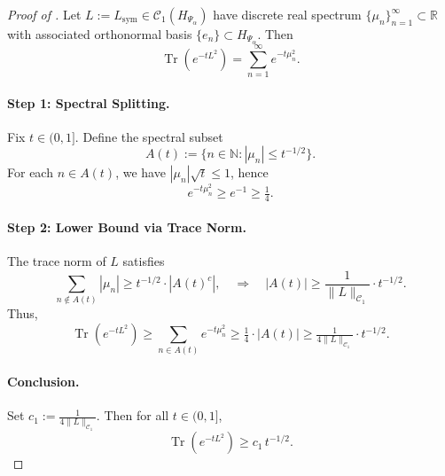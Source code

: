\begin{proof}[Proof of ]
Let \( L := L_{\mathrm{sym}} \in \mathcal{C}_1(H_{\Psi_\alpha}) \) have discrete real spectrum \( \{ \mu_n \}_{n=1}^\infty \subset \mathbb{R} \) with associated orthonormal basis \( \{ e_n \} \subset H_{\Psi_\alpha} \). Then
\[
\operatorname{Tr}(e^{-t L^2}) = \sum_{n=1}^\infty e^{-t \mu_n^2}.
\]

\paragraph{Step 1: Spectral Splitting.}
Fix \( t \in (0,1] \). Define the spectral subset
\[
A(t) := \{ n \in \mathbb{N} : |\mu_n| \le t^{-1/2} \}.
\]
For each \( n \in A(t) \), we have \( |\mu_n| \sqrt{t} \le 1 \), hence
\[
e^{-t \mu_n^2} \ge e^{-1} \ge \tfrac{1}{4}.
\]

\paragraph{Step 2: Lower Bound via Trace Norm.}
The trace norm of \( L \) satisfies
\[
\sum_{n \notin A(t)} |\mu_n| \ge t^{-1/2} \cdot |A(t)^c|,
\quad \Rightarrow \quad |A(t)| \ge \frac{1}{\|L\|_{\mathcal{C}_1}} \cdot t^{-1/2}.
\]
Thus,
\[
\operatorname{Tr}(e^{-t L^2}) \ge \sum_{n \in A(t)} e^{-t \mu_n^2}
\ge \tfrac{1}{4} \cdot |A(t)| \ge \tfrac{1}{4 \|L\|_{\mathcal{C}_1}} \cdot t^{-1/2}.
\]

\paragraph{Conclusion.}
Set \( c_1 := \tfrac{1}{4 \|L\|_{\mathcal{C}_1}} \). Then for all \( t \in (0,1] \),
\[
\operatorname{Tr}(e^{-t L^2}) \ge c_1 \, t^{-1/2}.
\]
\end{proof}
